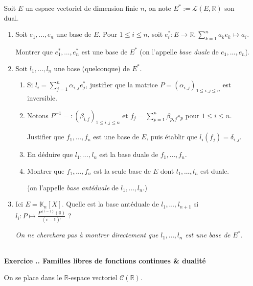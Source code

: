 \documentclass{article}
\newcommand{\mb}[1]{\mathbb{#1}}
\newcommand{\mc}[1]{\mathcal{#1}}
\newcounter{exo}
\newcommand{\exercice}[1][\null]{\textbf{\\ Exercice \thesection.\theexo. #1} \addtocounter{exo}{1}}
\begin{document}
Soit $E$ un espace vectoriel de dimension finie $n$, on note $E^*:= \mc{L}(E, \mb{R})$ son dual.

\begin{enumerate}

\item  Soit $e_1, \dots, e_n$ une base de $E$. Pour $1 \le i \le n$, soit $e_i^* : E \rightarrow \mb{R},\sum_{k=1}^n a_k e_k \mapsto a_i$.

Montrer que $e_1^*, \dots, e_n^*$ est une base de $E^*$ (on l'appelle \emph{base duale} de $e_1, \dots, e_n$).

\item Soit $ l_1, \dots, l_n$ une base (quelconque) de $E^*$.

\begin{enumerate}

\item Si $l_i = \sum_{j=1}^n {\alpha_{i,j}} e_j^*$, justifier que la matrice $P = (\alpha_{i,j})_{1 \le i,j \le n}$ est inversible.

\item Notons $P^{-1} =: (\beta_{i,j})_{1 \le i,j \le n}$ et $f_j = \sum_{p=1}^n {\beta_{p,j}} e_p$ pour $1 \le i \le n$.

Justifier que $f_1, \dots, f_n$ est une base de $E$, puis établir que $l_i(f_j) = \delta_{i,j}$.

\item En déduire que $l_1, \dots, l_n$ est la base duale de $f_1, \dots, f_n$.

\item Montrer que $f_1, \dots, f_n$ est la seule base de $E$ dont $l_1, \dots, l_n$ est duale.

(on l'appelle \emph{base antéduale} de $l_1, \dots, l_n$.)

\end{enumerate}

\item Ici $E = \mb{K}_n[X]$. Quelle est la base antéduale de $l_1, \dots, l_{n+1}$ si $l_i : P \mapsto \frac{P^{(i-1)}(0)}{(i-1)!}$ ?

\emph{On ne cherchera pas à montrer directement que $l_1, \dots, l_n$ est une base de $E^*$.}

\end{enumerate}


\exercice[Familles libres de fonctions continues \& dualité]

On se place dans le $\mb{R}$-espace vectoriel $\mc{C}(\mb{R})$.
\end{document}
